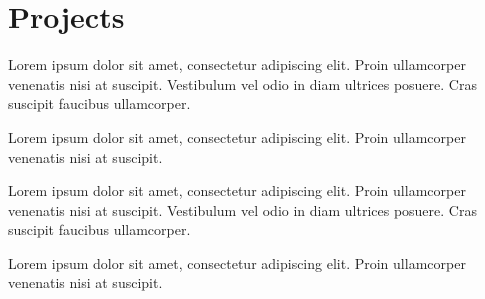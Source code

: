\documentclass[]{plushcv}
\begin{document}
\begin{minipage}[t]{0.70\textwidth}

\section{Projects}

\begin{tightemize}
\item Lorem ipsum dolor sit amet, consectetur adipiscing elit. Proin ullamcorper venenatis nisi at suscipit. Vestibulum vel odio in diam ultrices posuere. Cras suscipit faucibus ullamcorper.
\item Lorem ipsum dolor sit amet, consectetur adipiscing elit. Proin ullamcorper venenatis nisi at suscipit.
\end{tightemize}
\sectionsep

\begin{tightemize}
\item Lorem ipsum dolor sit amet, consectetur adipiscing elit. Proin ullamcorper venenatis nisi at suscipit. Vestibulum vel odio in diam ultrices posuere. Cras suscipit faucibus ullamcorper. 
\item Lorem ipsum dolor sit amet, consectetur adipiscing elit. Proin ullamcorper venenatis nisi at suscipit.
\end{tightemize}
\sectionsep


%
%

\end{minipage} 
\hfill
\end{document}
